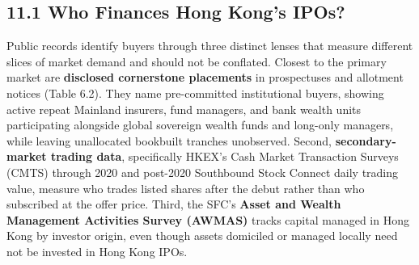 \documentclass[11pt,letterpaper]{article}
\begin{document}
\subsection*{\texorpdfstring{11.1 Who Finances Hong Kong's IPOs?}{11.1 Who Finances Hong Kong's IPOs?}}
Public records identify buyers through three distinct lenses that measure different slices of market demand and should not be conflated. Closest to the primary market are \textbf{disclosed cornerstone placements} in prospectuses and allotment notices (Table 6.2). They name pre-committed institutional buyers, showing active repeat Mainland insurers, fund managers, and bank wealth units participating alongside global sovereign wealth funds and long-only managers, while leaving unallocated bookbuilt tranches unobserved. Second, \textbf{secondary-market trading data}, specifically HKEX's Cash Market Transaction Surveys (CMTS) through 2020 and post-2020 Southbound Stock Connect daily trading value, measure who trades listed shares after the debut rather than who subscribed at the offer price. Third, the SFC's \textbf{Asset and Wealth Management Activities Survey (AWMAS)} tracks capital managed in Hong Kong by investor origin, even though assets domiciled or managed locally need not be invested in Hong Kong IPOs.
\end{document}
